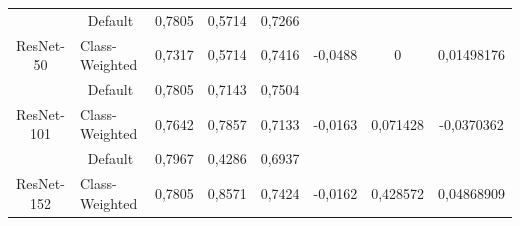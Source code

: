 \begin{table}[hbtp]
\begin{center}
\begin{tabular}{|c|c|lll|ccc|}
															 & Default                                                   & \multicolumn{1}{l|}{0,7805}  & \multicolumn{1}{l|}{0,5714} & 0,7266                   & \multicolumn{1}{c|}{}                          & \multicolumn{1}{c|}{}                           &                              \\ \cline{2-5}
		\multirow{-2}{*}{ResNet-50}                          & \multicolumn{1}{l|}{Class-Weighted}                       & \multicolumn{1}{l|}{0,7317}  & \multicolumn{1}{l|}{0,5714} & 0,7416                   & \multicolumn{1}{c|}{\multirow{-2}{*}{-0,0488}} & \multicolumn{1}{c|}{\multirow{-2}{*}{0}}        & \multirow{-2}{*}{0,01498176} \\ \hline
															 & Default                                                   & \multicolumn{1}{l|}{0,7805}  & \multicolumn{1}{l|}{0,7143} & 0,7504                   & \multicolumn{1}{c|}{}                          & \multicolumn{1}{c|}{}                           &                              \\ \cline{2-5}
		\multirow{-2}{*}{ResNet-101}                         & \multicolumn{1}{l|}{Class-Weighted}                       & \multicolumn{1}{l|}{0,7642}  & \multicolumn{1}{l|}{0,7857} & 0,7133                   & \multicolumn{1}{c|}{\multirow{-2}{*}{-0,0163}} & \multicolumn{1}{c|}{\multirow{-2}{*}{0,071428}} & \multirow{-2}{*}{-0,0370362} \\ \hline
															 & Default                                                   & \multicolumn{1}{l|}{0,7967}  & \multicolumn{1}{l|}{0,4286} & 0,6937                   & \multicolumn{1}{c|}{}                          & \multicolumn{1}{c|}{}                           &                              \\ \cline{2-5}
		\multirow{-2}{*}{ResNet-152}                         & \multicolumn{1}{l|}{Class-Weighted}                       & \multicolumn{1}{l|}{0,7805}  & \multicolumn{1}{l|}{0,8571} & 0,7424                   & \multicolumn{1}{c|}{\multirow{-2}{*}{-0,0162}} & \multicolumn{1}{c|}{\multirow{-2}{*}{0,428572}} & \multirow{-2}{*}{0,04868909} \\ \hline
		\end{tabular}
	\end{center}
\end{table}

